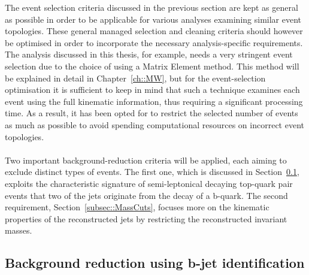 The event selection criteria discussed in the previous section are kept as general as possible in order to be applicable for various analyses examining similar event topologies.
These general managed selection and cleaning criteria should however be optimised in order to incorporate the necessary analysis-specific requirements.
\\
The analysis discussed in this thesis, for example, needs a very stringent event selection due to the choice of using a Matrix Element method.
This method will be explained in detail in Chapter~\ref{ch::MW}, but for the event-selection optimisation it is sufficient to keep in mind that such a technique examines each event using the full kinematic information, thus requiring a significant processing time. As a result, it has been opted for to restrict the selected number of events as much as possible to avoid spending computational resources on incorrect event topologies.
\\
\\
Two important background-reduction criteria will be applied, each aiming to exclude distinct types of events. 
The first one, which is discussed in Section~\ref{subsec::BTag}, exploits the characteristic signature of semi-leptonical decaying top-quark pair events that two of the jets originate from the decay of a b-quark. The second requirement, Section~\ref{subsec::MassCuts}, focuses more on the kinematic properties of the reconstructed jets by restricting the reconstructed invariant masses.

\subsection{Background reduction using b-jet identification}\label{subsec::BTag}

